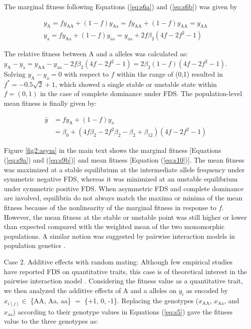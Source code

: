 \documentclass[12pt,]{article}
\begin{document}
\noindent
The marginal fitness following Equations (\ref{eq:s6a}) and (\ref{eq:s6b}) was given by 

\begin{subequations}
\begin{align}
y_\mathrm{A} = fy_\mathrm{AA} + (1-f)y_\mathrm{Aa} = fy_\mathrm{AA} + (1-f)y_\mathrm{AA} = y_\mathrm{AA} \label{eq:s9a} \\
y_\mathrm{a} = fy_\mathrm{Aa} + (1-f)y_\mathrm{aa} = y_\mathrm{aa} + 2f\beta_2(4f-2f^2-1) \label{eq:s9b}
\end{align}
\end{subequations}

\noindent
The relative fitness between A and a alleles was calculated as: $y_\mathrm{A} - y_\mathrm{a} = y_\mathrm{AA} - y_\mathrm{aa} - 2f\beta_2(4f-2f^2-1) = 2\beta_2(1-f)(4f-2f^2-1)$. Solving $y_\mathrm{A} - y_\mathrm{a} = 0$ with respect to $f$ within the range of (0,1) resulted in $f^*=-0.5\sqrt{2}+1$, which showed a single stable or unstable state within $f=(0,1)$ in the case of complete dominance under FDS. The population-level mean fitness is finally given by:

\begin{equation}
\begin{split}
\bar{y} &= fy_\mathrm{A} + (1-f)y_\mathrm{a} \\
&= \beta_0 + (4f\beta_2-2f^2\beta_2-\beta_2+\beta_{12})(4f-2f^2-1) \label{eq:s10}
\end{split}
\end{equation}

\noindent
Figure \ref{fig2:asym} in the main text shows the marginal fitness [Equations (\ref{eq:s9a}) and (\ref{eq:s9b})] and mean fitness [Equation (\ref{eq:s10})]. The mean fitness was maximized at a stable equilibrium at the intermediate allele frequency under symmetric negative FDS, whereas it was minimized at an unstable equilibrium under symmetric positive FDS. When asymmetric FDS and complete dominance are involved, equilibria do not always match the maxima or minima of the mean fitness because of the nonlinearity of the marginal fitness in response to $f$. However, the mean fitness at the stable or unstable point was still higher or lower than expected compared with the weighted mean of the two monomorphic populations. A similar notion was suggested by pairwise interaction models in population genetics \citep{cockerham1972frequency, schneider_maximization_2008}.

Case 2. Additive effects with random mating: Although few empirical studies have reported FDS on quantitative traits, this case is of theoretical interest in the pairwise interaction model \citep{schneider_maximization_2008}. Considering the fitness value as a quantitative trait, we then analyzed the additive effects of A and a alleles on $y_i$ as encoded by $x_{i(j)} \in $ \{AA, Aa, aa\} $=$ \{+1, 0, -1\}. Replacing the genotypes ($x_\mathrm{AA}$, $x_\mathrm{Aa}$, and $x_\mathrm{aa}$) according to their genotype values in Equations (\ref{eq:s5}) gave the fitness value to the three genotypes as:
\end{document}
